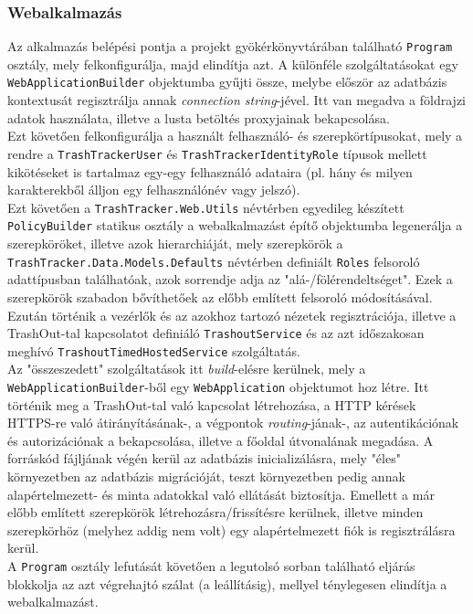 \subsubsection{Webalkalmazás}

Az alkalmazás belépési pontja a projekt gyökérkönyvtárában található \texttt{Program} osztály, mely felkonfigurálja, majd elindítja azt. A különféle szolgáltatásokat egy \texttt{WebApplicationBuilder} objektumba gyűjti össze, melybe először az adatbázis kontextusát regisztrálja annak \textit{connection string}-jével. Itt van megadva a földrajzi adatok használata, illetve a lusta betöltés proxyjainak bekapcsolása.\\
Ezt követően felkonfigurálja a használt felhasználó- és szerepkörtípusokat, mely a rendre a \texttt{TrashTrackerUser} és \texttt{TrashTrackerIdentityRole} típusok mellett kikötéseket is tartalmaz egy-egy felhasználó adataira (pl. hány és milyen karakterekből álljon egy felhasználónév vagy jelszó).\\
Ezt követően a \texttt{TrashTracker.Web.Utils} névtérben egyedileg készített \texttt{PolicyBuilder} statikus osztály a webalkalmazást építő objektumba legenerálja a szerepköröket, illetve azok hierarchiáját, mely szerepkörök a \texttt{TrashTracker.Data.Models.Defaults} névtérben definiált \texttt{Roles} felsoroló adattípusban találhatóak, azok sorrendje adja az "alá-/fölérendeltséget". Ezek a szerepkörök szabadon bővíthetőek az előbb említett felsoroló módosításával.\\
Ezután történik a vezérlők és az azokhoz tartozó nézetek regisztrációja, illetve a TrashOut-tal kapcsolatot definiáló \texttt{TrashoutService} és az azt időszakosan meghívó \texttt{TrashoutTimedHostedService} szolgáltatás.\\
Az "összeszedett" szolgáltatások itt \textit{build}-elésre kerülnek, mely a \texttt{WebApplicationBuilder}-ből egy \texttt{WebApplication} objektumot hoz létre. Itt történik meg a TrashOut-tal való kapcsolat létrehozása, a HTTP kérések HTTPS-re való átirányításának-, a végpontok \textit{routing}-jának-, az autentikációnak és autorizációnak a bekapcsolása, illetve a főoldal útvonalának megadása. A forráskód fájljának végén kerül az adatbázis inicializálásra, mely "éles" környezetben az adatbázis migrációját, teszt környezetben pedig annak alapértelmezett- és minta adatokkal való ellátását biztosítja. Emellett a már előbb említett szerepkörök létrehozásra/frissítésre kerülnek, illetve minden szerepkörhöz (melyhez addig nem volt) egy alapértelmezett fiók is regisztrálásra kerül.\\
A \texttt{Program} osztály lefutását követően a legutolsó sorban található eljárás blokkolja az azt végrehajtó szálat (a leállításig), mellyel ténylegesen elindítja a webalkalmazást.


